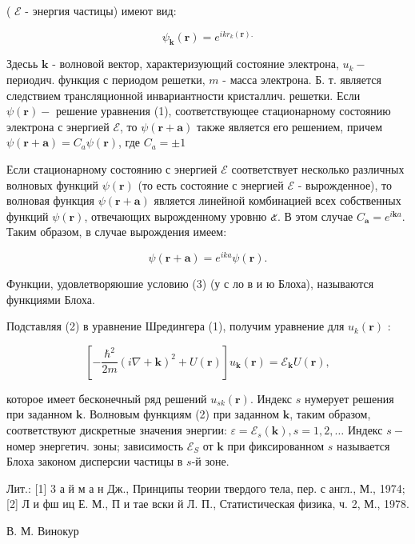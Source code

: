 \documentclass[10pt]{article}
\begin{document}
( $\mathscr{E}$ - энергия частицы) имеют вид:



\[

\psi_{\boldsymbol{k}}(\boldsymbol{r})=e^{i k r_{k}(\boldsymbol{r}) .}

\]



Здесьь $\boldsymbol{k}$ - волновой вектор, характеризующий состояние электрона, $u_{k}-$ периодич. функция с периодом решетки, $m$ - масса электрона. Б. т. является следствием трансляционной инвариантности кристаллич. решетки. Если $\psi(\boldsymbol{r})-$ решение уравнения (1), соответствующее стационарному состоянию электрона с энергией $\mathscr{E}$, то $\psi(\boldsymbol{r}+\boldsymbol{a})$ также является его решением, причем $\psi(\boldsymbol{r}+\boldsymbol{a})=C_{a} \psi(\boldsymbol{r})$, где $C_{a}= \pm 1$



Если стационарному состоянию с энергией $\mathscr{E}$ соответствует несколько различных волновых функций $\psi(\boldsymbol{r})$ (то есть состояние с энергией $\mathscr{E}$ - вырожденное), то волновая функция $\psi(\boldsymbol{r}+\boldsymbol{a})$ является линейной комбинацией всех собственных функций $\psi(\boldsymbol{r})$, отвечающих вырожденному уровню ๕. В этом случае $C_{\boldsymbol{a}}=e^{i \boldsymbol{k} a}$. Таким образом, в случае вырождения имеем:



\[

\psi(\boldsymbol{r}+\boldsymbol{a})=e^{i k a} \psi(\boldsymbol{r}) .

\]



Функции, удовлетворяюшие условию (3) (у с ло в и ю Блоха), называются функциями Блоха.



Подставляя (2) в уравнение Шредингера (1), получим уравнение для $u_{k}(\boldsymbol{r})$ :



\[

\left[-\frac{\hbar^{2}}{2 m}(i \nabla+\boldsymbol{k})^{2}+U(\boldsymbol{r})\right] u_{\boldsymbol{k}}(\boldsymbol{r})=\mathscr{E}_{\boldsymbol{k}} U(\boldsymbol{r}),

\]



которое имеет бесконечный ряд решений $u_{s k}(\boldsymbol{r})$. Индекс $s$ нумерует решения при заданном $\boldsymbol{k}$. Волновым функциям (2) при заданном $\boldsymbol{k}$, таким образом, соответствуют дискретные значения энергии: $\varepsilon=\mathscr{E}_{s}(\boldsymbol{k}), s=1,2, \ldots$ Индекс $s-$ номер энергетич. зоны; зависимость $\mathscr{E}_{S}$ от $\boldsymbol{k}$ при фиксированном $s$ называется Блоха законом дисперсии частицы в $s$-й зоне.



Лит.: [1] 3 а й м а н Дж., Принципы теории твердого тела, пер. с англ., М., 1974; [2] Л и фш иц Е. М., П и тае вски й Л. П., Статистическая физика, ч. 2, М., 1978.



В. М. Винокур
\end{document}
